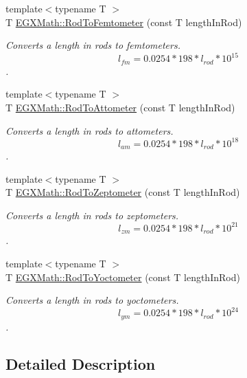 \begin{DoxyCompactItemize}
{\footnotesize template$<$typename T $>$ }\\T \mbox{\hyperlink{group___e_g_x_math-_conversions-_length_conversions-_surveyors-_rod-_s_i_ga93c5626ebf87e3f15901731a1e2e9cb3}{E\+G\+X\+Math\+::\+Rod\+To\+Femtometer}} (const T length\+In\+Rod)
\begin{DoxyCompactList}\small\item\em Converts a length in rods to femtometers. \[ l_{fm}=0.0254 * 198 * l_{rod} * 10^{15} \]. \end{DoxyCompactList}\item 
{\footnotesize template$<$typename T $>$ }\\T \mbox{\hyperlink{group___e_g_x_math-_conversions-_length_conversions-_surveyors-_rod-_s_i_ga8ea230e8e68a945a135edff4ba01a449}{E\+G\+X\+Math\+::\+Rod\+To\+Attometer}} (const T length\+In\+Rod)
\begin{DoxyCompactList}\small\item\em Converts a length in rods to attometers. \[ l_{am}=0.0254 * 198 * l_{rod} * 10^{18} \]. \end{DoxyCompactList}\item 
{\footnotesize template$<$typename T $>$ }\\T \mbox{\hyperlink{group___e_g_x_math-_conversions-_length_conversions-_surveyors-_rod-_s_i_gae5ab77b04e6ee5bfdce5aaa3917b92a5}{E\+G\+X\+Math\+::\+Rod\+To\+Zeptometer}} (const T length\+In\+Rod)
\begin{DoxyCompactList}\small\item\em Converts a length in rods to zeptometers. \[ l_{zm}=0.0254 * 198 * l_{rod} * 10^{21} \]. \end{DoxyCompactList}\item 
{\footnotesize template$<$typename T $>$ }\\T \mbox{\hyperlink{group___e_g_x_math-_conversions-_length_conversions-_surveyors-_rod-_s_i_ga8ed4c9bfa230e77380ff81ff9ed59a6e}{E\+G\+X\+Math\+::\+Rod\+To\+Yoctometer}} (const T length\+In\+Rod)
\begin{DoxyCompactList}\small\item\em Converts a length in rods to yoctometers. \[ l_{ym}=0.0254 * 198 * l_{rod} * 10^{24} \]. \end{DoxyCompactList}\end{DoxyCompactItemize}


\subsection{Detailed Description}


